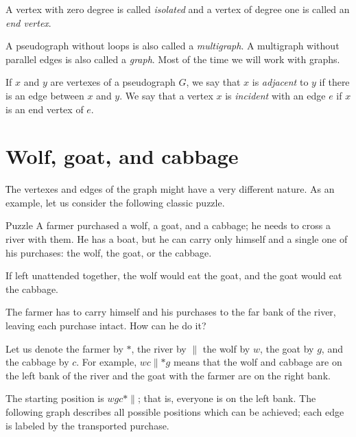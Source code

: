 A vertex with zero degree is called \emph{isolated} and a vertex of degree one is called an \emph{end vertex}.

\smallskip

A pseudograph without loops is also called a \emph{multigraph}.
A multigraph without parallel edges is also called a \emph{graph}.
Most of the time we will work with graphs.

If $x$ and $y$ are vertexes of a pseudograph $G$, we say that $x$ is \emph{adjacent} to $y$ if there is an edge between $x$ and $y$.
We say that a vertex $x$ is \emph{incident} with an edge $e$ if $x$ is an end vertex of $e$.

\section*{Wolf, goat, and cabbage}

Тhe vertexes and edges of the graph might have a very different nature.
As an example, let us consider the following classic puzzle.

\begin{thm}{Puzzle}
A farmer purchased a wolf, a goat, and a cabbage;
he needs to cross a river with them.
He has a boat, but he can carry only himself and a single one of his purchases: the wolf, the goat, or the cabbage.

If left unattended together, the wolf would eat the goat, and the goat would eat the cabbage.

The farmer has to carry himself and his purchases to the far bank of the river, leaving each purchase intact. How can he do it?
\end{thm}

Let us denote the farmer by $*$, the river by ${\parallel}$
the wolf by $w$, the goat by $g$, and the cabbage by $c$.
For example, $wc{\parallel}{*}g$ means that the wolf and cabbage are on the left bank of the river and the goat with the farmer are on the right bank.

{\sloppy

The starting position is $wgc{*}{\parallel}$; that is, everyone is on the left bank.
The following graph describes all possible positions which can be achieved;
each edge is labeled by the transported purchase.

}

